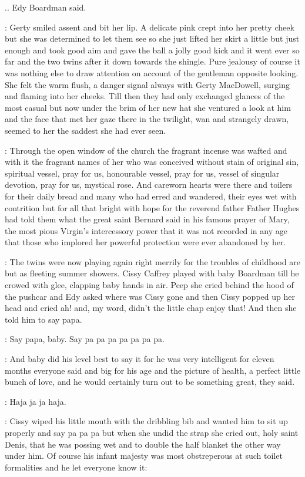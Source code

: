 .. Edy Boardman said.

:
Gerty smiled assent and bit her lip. A delicate pink crept into her
pretty cheek but she was determined to let them see so she just lifted her
skirt a little but just enough and took good aim and gave the ball a jolly
good kick and it went ever so far and the two twins after it down towards
the shingle. Pure jealousy of course it was nothing else to draw attention
on account of the gentleman opposite looking. She felt the warm flush, a
danger signal always with Gerty MacDowell, surging and flaming into her
cheeks. Till then they had only exchanged glances of the most casual but
now under the brim of her new hat she ventured a look at him and the face
that met her gaze there in the twilight, wan and strangely drawn, seemed
to her the saddest she had ever seen.

:
Through the open window of the church the fragrant incense was wafted and
with it the fragrant names of her who was conceived without stain of
original sin, spiritual vessel, pray for us, honourable vessel, pray for
us, vessel of singular devotion, pray for us, mystical rose. And careworn
hearts were there and toilers for their daily bread and many who had erred
and wandered, their eyes wet with contrition but for all that bright with
hope for the reverend father Father Hughes had told them what the great
saint Bernard said in his famous prayer of Mary, the most pious Virgin's
intercessory power that it was not recorded in any age that those who
implored her powerful protection were ever abandoned by her.

:
The twins were now playing again right merrily for the troubles of
childhood are but as fleeting summer showers. Cissy Caffrey played with
baby Boardman till he crowed with glee, clapping baby hands in air. Peep
she cried behind the hood of the pushcar and Edy asked where was Cissy
gone and then Cissy popped up her head and cried ah! and, my word,
didn't the little chap enjoy that! And then she told him to say papa.

\cissy:
Say papa, baby. Say pa pa pa pa pa pa pa.

:
And baby did his level best to say it for he was very intelligent for
eleven months everyone said and big for his age and the picture of health,
a perfect little bunch of love, and he would certainly turn out to be
something great, they said.

\baby:
Haja ja ja haja.

:
Cissy wiped his little mouth with the dribbling bib and wanted him to sit
up properly and say pa pa pa but when she undid the strap she cried out,
holy saint Denis, that he was possing wet and to double the half blanket
the other way under him. Of course his infant majesty was most
obstreperous at such toilet formalities and he let everyone know it:

